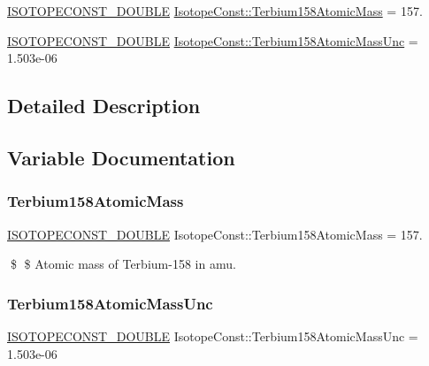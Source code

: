 \begin{DoxyCompactItemize}
\item 
\mbox{\hyperlink{group___isotope_const-_macros_ga8f45a7272ce02c0b4c65c44636ed719a}{I\+S\+O\+T\+O\+P\+E\+C\+O\+N\+S\+T\+\_\+\+D\+O\+U\+B\+LE}} \mbox{\hyperlink{group___isotope_const-_terbium-_tb158_gae47811be8904a71590b4d45e01a0d812}{Isotope\+Const\+::\+Terbium158\+Atomic\+Mass}} = 157.
\item 
\mbox{\hyperlink{group___isotope_const-_macros_ga8f45a7272ce02c0b4c65c44636ed719a}{I\+S\+O\+T\+O\+P\+E\+C\+O\+N\+S\+T\+\_\+\+D\+O\+U\+B\+LE}} \mbox{\hyperlink{group___isotope_const-_terbium-_tb158_ga97719ef18cae9ac091f3bc3d3e21c834}{Isotope\+Const\+::\+Terbium158\+Atomic\+Mass\+Unc}} = 1.\+503e-\/06
\end{DoxyCompactItemize}


\subsection{Detailed Description}


\subsection{Variable Documentation}
\mbox{\label{group___isotope_const-_terbium-_tb158_gae47811be8904a71590b4d45e01a0d812}} 
\subsubsection{\texorpdfstring{Terbium158\+Atomic\+Mass}{Terbium158AtomicMass}}
{\footnotesize\ttfamily \mbox{\hyperlink{group___isotope_const-_macros_ga8f45a7272ce02c0b4c65c44636ed719a}{I\+S\+O\+T\+O\+P\+E\+C\+O\+N\+S\+T\+\_\+\+D\+O\+U\+B\+LE}} Isotope\+Const\+::\+Terbium158\+Atomic\+Mass = 157.}

\$ \$ Atomic mass of Terbium-\/158 in amu. \mbox{\label{group___isotope_const-_terbium-_tb158_ga97719ef18cae9ac091f3bc3d3e21c834}} 
\subsubsection{\texorpdfstring{Terbium158\+Atomic\+Mass\+Unc}{Terbium158AtomicMassUnc}}
{\footnotesize\ttfamily \mbox{\hyperlink{group___isotope_const-_macros_ga8f45a7272ce02c0b4c65c44636ed719a}{I\+S\+O\+T\+O\+P\+E\+C\+O\+N\+S\+T\+\_\+\+D\+O\+U\+B\+LE}} Isotope\+Const\+::\+Terbium158\+Atomic\+Mass\+Unc = 1.\+503e-\/06}

